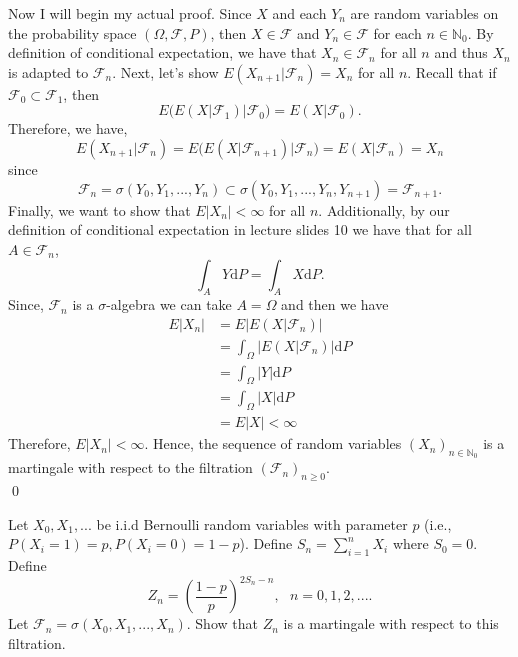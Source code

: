 \documentclass[10pt]{amsart}
\newcommand{\D}{\mathrm{d}}
\begin{document}
\noindent
Now I will begin my actual proof.
Since $X$ and each $Y_n$ are random variables on the probability space $(\Omega, \mathcal F, P)$, then $X \in \mathcal F$ and $Y_n \in \mathcal F$ for each $n \in \mathbb N_0$.
By definition of conditional expectation, we have that $X_n \in \mathcal F_n$ for all $n$ and thus $X_n$ is adapted to $\mathcal F_n$.
Next, let's show $E (X_{n + 1} | \mathcal F_n) = X_n$ for all $n$.
Recall that if $\mathcal F_0 \subset \mathcal F_1$, then
$$
E\big(E(X|\mathcal F_1) \big|\mathcal F_0\big) = E(X|\mathcal F_0).
$$
Therefore, we have,
$$
E (X_{n + 1}|\mathcal F_n) = E \big( E(X | \mathcal F_{n + 1} ) \big| \mathcal F_n\big) = E(X | \mathcal F_n ) = X_n
$$
since
$$
\mathcal F_n = \sigma(Y_0, Y_1, ..., Y_n) \subset \sigma(Y_0, Y_1, ..., Y_n, Y_{n + 1}) = \mathcal F_{n + 1}.
$$
Finally, we want to show that $E | X_n | < \infty$ for all $n$.
Additionally, by our definition of conditional expectation in lecture slides 10 we have that for all $A \in \mathcal F_n$,
$$\int_{A} Y \D P = \int_{A} X \D P.$$
Since, $\mathcal F_n$ is a $\sigma$-algebra we can take $A = \Omega$ and then we have
\begin{align*}
E | X_n |  &= E \big| E (X | \mathcal F_n) \big| \\
	&= \int_\Omega \big|E (X | \mathcal F_n ) \big|\D P \\
	&= \int_\Omega |Y| \D P \\
	&= \int_\Omega |X| \D P \\
	&= E |X| < \infty
\end{align*}
Therefore, $E | X_n | < \infty$. Hence, the sequence of random variables $(X_n)_{n \in \mathbb N_0}$ is a martingale with respect to the filtration $(\mathcal{F}_n)_{n \geq 0}$.\\
\qed \\
\newpage

 Let $X_0, X_1, . . .$  be i.i.d Bernoulli random variables with parameter $p$ (i.e., $P(X_i = 1) = p, P(X_i = 0) =1- p$). Define $S_n = \sum_{i=1}^n X_i$ where $S_0 = 0$. Define
$$Z_n = \left(\frac{1-p}{p} \right)^{2S_n-n}, \,\,\,\, n = 0, 1, 2, . . . .$$
Let $\mathcal{F}_n = \sigma(X_0, X_1, . . . , X_n )$. Show that $Z_n$ is a martingale with respect to this filtration. \\
\end{document}
